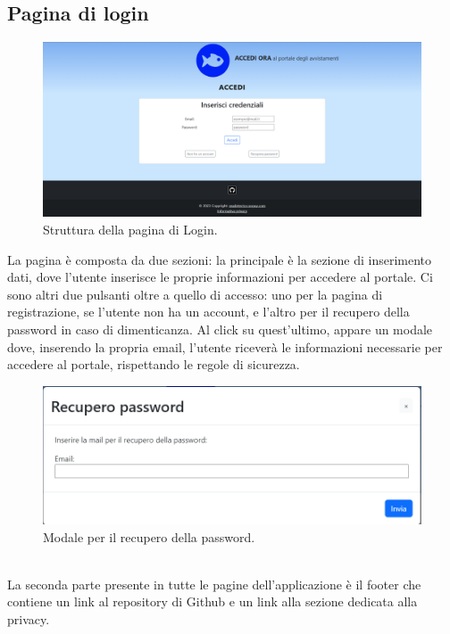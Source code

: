 \documentclass[a4paper,final,12pt]{report}
\begin{document}
\newpage

\subsection{Pagina di login}
\begin{figure}[hbtp]
\centering
\includegraphics[scale=0.31]{img_concettuale/login.png}
\caption{Struttura della pagina di Login.}
\end{figure}
La pagina è composta da due sezioni: la principale è la sezione di inserimento dati, dove l'utente inserisce le proprie informazioni per accedere al portale. Ci sono altri due pulsanti oltre a quello di accesso: uno per la pagina di registrazione, se l'utente non ha un account, e l'altro per il recupero della password in caso di dimenticanza. Al click su quest'ultimo, appare un modale dove, inserendo la propria email, l'utente riceverà le informazioni necessarie per accedere al portale, rispettando le regole di sicurezza.
\begin{figure}[hbtp]
\centering
\includegraphics[scale=0.42]{img_concettuale/recuperoPWD.png}
\caption{Modale per il recupero della password.}
\end{figure}
\\La seconda parte presente in tutte le pagine dell'applicazione è il footer che contiene un link al repository di Github e un link alla sezione dedicata alla privacy.
\end{document}
